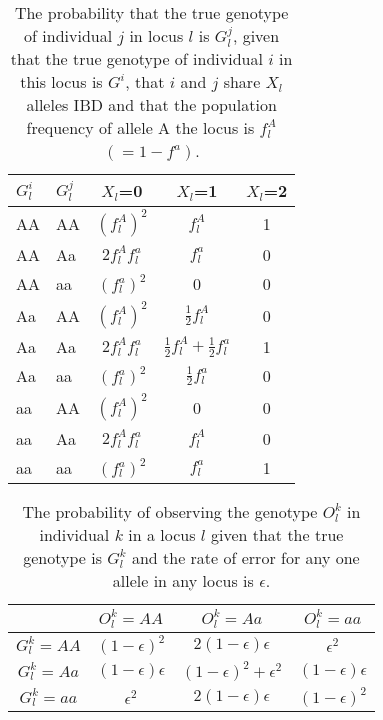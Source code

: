 \documentclass[a4paper, 11pt]{article}
\begin{document}
\begin{table}[h!]
  \centering
  \begin{tabular}{|l|l|c|c|c|}
\hline
$G^{i}_l$ & $G^{j}_l$    & $X_l$=0 & $X_l$=1 & $X_l$=2\\
\hline
AA & AA & $(f^A_l)^2$ & $f^A_l$ & 1\\
AA & Aa & $2f^A_lf^a_l$ & $f^a_l$ & 0\\
AA & aa & $(f^a_l)^2$ & 0 & 0\\
Aa & AA & $(f^A_l)^2$ & $\frac{1}{2}f^A_l$ & 0\\
Aa & Aa & $2f^A_lf^a_l$ & $\frac{1}{2}f^A_l + \frac{1}{2}f^a_l$ & 1\\
Aa & aa & $(f^a_l)^2$ & $\frac{1}{2}f^a_l$ & 0\\
aa & AA & $(f^A_l)^2$ & 0 & 0\\
aa & Aa & $2f^A_lf^a_l$ & $f^A_l$ & 0\\
aa & aa & $(f^a_l)^2$ & $f^a_l$ & 1\\
\hline
  \end{tabular}
  \caption{The probability that the true genotype of individual $j$ in locus $l$ is $G^{j}_l$, given that the true genotype of individual $i$ in this locus is $G^{i}$, that $i$ and $j$ share $X_l$ alleles IBD and that the population frequency of allele A the locus is $f^A_l$ $(=1-f^a)$.}
\label{tab:cond_prob}
\end{table}

\begin{table}[h!]
  \centering
  \begin{tabular}{|c|c|c|c|}
\hline
                         &$ O^k_l=AA$ & $ O^k_l=Aa$ & $ O^k_l=aa$\\
\hline
 $G^k_l=AA$ & $(1-\epsilon)^2$ &$2(1-\epsilon)\epsilon$ &$\epsilon^2$\\
\hline
 $G^k_l=Aa$ & $(1-\epsilon)\epsilon$ &$(1-\epsilon)^2+\epsilon^2$ &$(1-\epsilon)\epsilon$\\
\hline
 $G^k_l=aa$ & $\epsilon^2$ &$2(1-\epsilon)\epsilon$ &$(1-\epsilon)^2$\\
\hline
\end{tabular}
  \caption{The probability of observing the genotype $O^{k}_l$ in individual $k$ in a locus $l$ given that the true genotype is $G^k_l$ and the rate of error for any one allele in any locus is $\epsilon$.}
\label{tab:epsilon}
\end{table}
\end{document}
